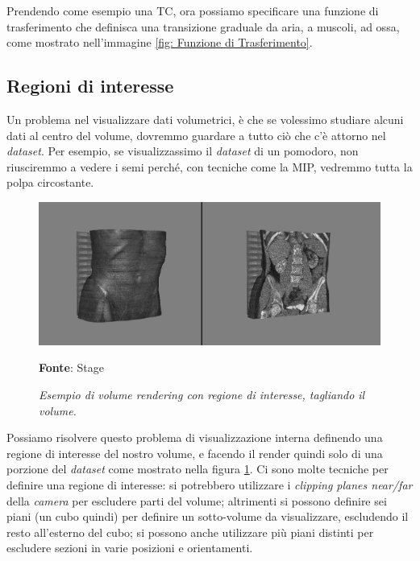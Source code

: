 Prendendo come esempio una TC, ora possiamo specificare una funzione di trasferimento che definisca una transizione graduale da aria, a muscoli, ad ossa, come mostrato nell'immagine \ref{fig: Funzione di Trasferimento}.

\subsection{Regioni di interesse}\label{sec:regioni-di-interesse}
Un problema nel visualizzare dati volumetrici, è che se volessimo studiare alcuni dati al centro del volume, dovremmo guardare a tutto ciò che c'è attorno nel \emph{dataset}. Per esempio, se visualizzassimo il \emph{dataset} di un pomodoro, non riusciremmo a vedere i semi perché, con tecniche come la MIP, vedremmo tutta la polpa circostante.

\begin{figure}[h]
    \centering
    \includegraphics[scale=0.3]{immagini/volumerendering/regionofinterest.png}
    \caption{\textit{Esempio di volume rendering con regione di interesse, tagliando il volume.}}
    \textbf{Fonte}: Stage
    \label{fig: Volume Rendering con Regione di Interesse}
\end{figure}

Possiamo risolvere questo problema di visualizzazione interna definendo una regione di interesse del nostro volume, e facendo il render quindi solo di una porzione del \emph{dataset} come mostrato nella figura \ref{fig: Volume Rendering con Regione di Interesse}. Ci sono molte tecniche per definire una regione di interesse: si potrebbero utilizzare i \emph{clipping planes near/far} della \emph{camera} per escludere parti del volume; altrimenti si possono definire sei piani (un cubo quindi) per definire un sotto-volume da visualizzare, escludendo il resto all'esterno del cubo; si possono anche utilizzare più piani distinti per escludere sezioni in varie posizioni e orientamenti.

